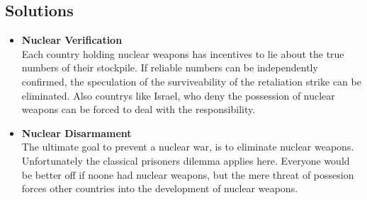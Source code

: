 \documentclass[12pt,twoside,a4paper]{scrartcl}
\begin{document}
        \subsection{Solutions}
            \begin{center}
            \begin{itemize}
                \item \textbf{Nuclear Verification}\\
                    Each country holding nuclear weapons has incentives to lie about the true numbers of their stockpile. If reliable numbers can be independently confirmed, the speculation of the surviveability of the retaliation strike can be eliminated. Also countrys like Israel, who deny the possession of nuclear weapons can be forced to deal with the responsibility.
                    
                \item \textbf{Nuclear Disarmament}\\
                    The ultimate goal to prevent a nuclear war, is to eliminate nuclear weapons. Unfortunately the classical prisoners dilemma applies here. Everyone would be better off if noone had nuclear weapons, but the mere threat of possesion forces other countries into the development of nuclear weapons.
            \end{itemize}
        \end{center}
\end{document}
